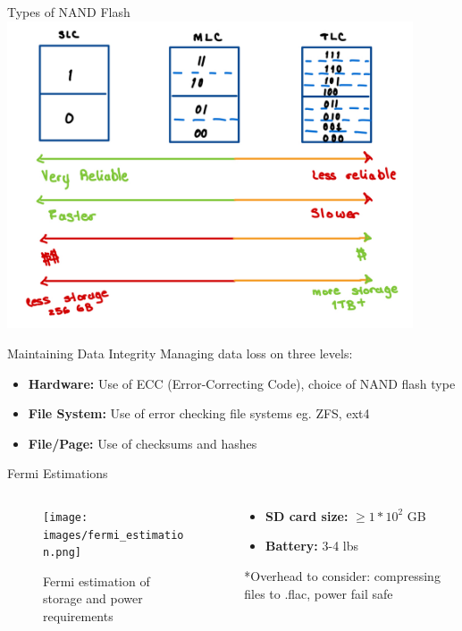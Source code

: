 \begin{frame}{Types of NAND Flash}
    \centering
    \includegraphics[height=0.9\textheight,width=0.9\textwidth,keepaspectratio]{images/flash_types.png}
\end{frame}

\begin{frame}{Maintaining Data Integrity}
    Managing data loss on three levels:
    \begin{itemize}
        \item \textbf{Hardware:} Use of ECC (Error-Correcting Code), choice of NAND flash type
        \item \textbf{File System:} Use of error checking file systems eg. ZFS, ext4
        \item \textbf{File/Page:} Use of checksums and hashes
    \end{itemize}
\end{frame}

\begin{frame}{Fermi Estimations}
    \begin{columns}
        \begin{column}{0.5\textwidth}
            \begin{figure}
                \centering
                \texttt{[image: images/fermi\_estimation.png]}
                \caption{Fermi estimation of storage and power requirements}
            \end{figure}
       \end{column}
        \begin{column}{0.5\textwidth}
            \begin{itemize}
            \item \textbf{SD card size:} $\ge1*10^2$ GB
            \item \textbf{Battery:} 3-4 lbs
            \end{itemize}
            *Overhead to consider: compressing files to .flac, power fail safe
        \end{column}
    \end{columns}
\end{frame}

